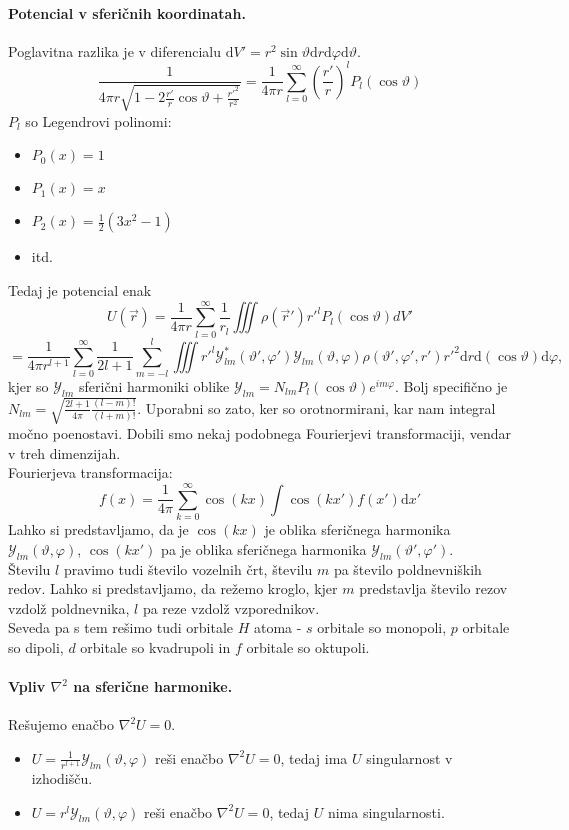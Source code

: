\documentclass[a4paper]{article}
\newcommand{\vct}[1]{\overrightarrow{#1}}
\newcommand{\dif}{\mathrm{d}}
\newcommand{\Sum}[2][0]{\sum_{{#2} = {#1}}^{\infty}}
\begin{document}
\paragraph{Potencial v sferičnih koordinatah.} Poglavitna razlika je v diferencialu $\dif V' = r^2\sin\vartheta\dif r \dif \varphi \dif \vartheta$.
$$\frac{1}{4\pi r\sqrt{1 - 2\frac{r'}{r}\cos\vartheta + \frac{r'^2}{r^2}}} = \frac{1}{4\pi r}\Sum{l} \left(\frac{r'}{r}\right)^lP_l(\cos\vartheta)$$
$P_l$ so Legendrovi polinomi:
\begin{itemize}
    \item $P_0(x) = 1$
    \item $P_1(x) = x$
    \item $P_2(x) = \frac{1}{2}\left(3x^2 - 1\right)$
    \item itd.
\end{itemize}
Tedaj je potencial enak
$$U(\vct{r}) = \frac{1}{4\pi r}\Sum{l}\frac{1}{r_l}\iiint\rho(\vct{r}')r'^l P_l(\cos\vartheta) dV'$$
$$ = \frac{1}{4\pi r^{l+1}}\Sum{l} \frac{1}{2l+1}\sum_{m=-l}^{l} \iiint r'^{l}\mathcal{Y}^*_{lm}(\vartheta', \varphi')\mathcal{Y}_{lm}(\vartheta, \varphi)\rho(\vartheta', \varphi', r') r'^2\dif r \dif(\cos\vartheta)\dif\varphi,$$
kjer so $\mathcal{Y}_{lm}$ sferični harmoniki oblike $\mathcal{Y}_{lm} = N_{lm}P_l(\cos\vartheta)e^{im\varphi}$. Bolj specifično je $\displaystyle{N_{lm} = \sqrt{\frac{2l + 1}{4\pi}\frac{(l-m)!}{(l+m)!}}}$. Uporabni so zato, ker so orotnormirani, kar nam integral močno poenostavi.
Dobili smo nekaj podobnega Fourierjevi transformaciji, vendar v treh dimenzijah. \\[2mm]
Fourierjeva transformacija:
$$f(x) = \frac{1}{4\pi} \Sum{k}\cos(kx) \int \cos(kx')f(x')\dif x'$$
Lahko si predstavljamo, da je $\cos(kx)$ je oblika sferičnega harmonika $\mathcal{Y}_{lm}\left(\vartheta, \varphi\right)$, $\cos(kx')$ pa je oblika sferičnega harmonika $\mathcal{Y}_{lm}\left(\vartheta', \varphi'\right)$. \\[3mm]
Številu $l$ pravimo tudi število vozelnih črt, številu $m$ pa število poldnevniških redov. Lahko si predstavljamo, da režemo kroglo, kjer $m$ predstavlja število rezov vzdolž poldnevnika, $l$ pa reze vzdolž vzporednikov. \\
Seveda pa s tem rešimo tudi orbitale $H$ atoma - $s$ orbitale so monopoli, $p$ orbitale so dipoli, $d$ orbitale so kvadrupoli in $f$ orbitale so oktupoli.
\paragraph{Vpliv $\nabla^2$ na sferične harmonike.} Rešujemo enačbo $\nabla^2U = 0$.
\begin{itemize}
    \item $\displaystyle{U = \frac{1}{r^{l+1}}\mathcal{Y}_{lm}(\vartheta, \varphi)}$ reši enačbo $\nabla^2U = 0$, tedaj ima $U$ singularnost v izhodišču.
    \item $\displaystyle{U = r^{l}\mathcal{Y}_{lm}(\vartheta, \varphi)}$ reši enačbo $\nabla^2U = 0$, tedaj $U$ nima singularnosti.
\end{itemize}
\end{document}
